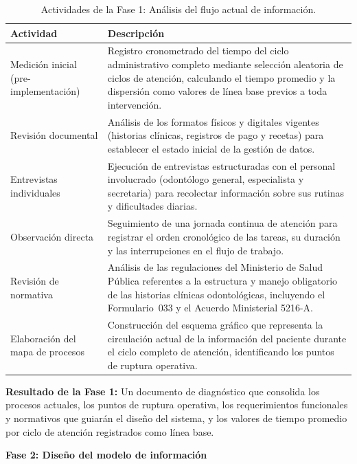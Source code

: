 \begin{table}[H]
\centering
\begin{tabular}{|p{4.5cm}|p{9cm}|}
\hline
\textbf{Actividad} & \textbf{Descripción} \\ \hline
Medición inicial
(pre-implemen\-tación)
  & Registro cronometrado del tiempo del ciclo administrativo
    completo mediante selección aleatoria de ciclos de atención,
    calculando el tiempo promedio y la dispersión como valores
    de línea base previos a toda intervención. \\ \hline
Revisión documental
  & Análisis de los formatos físicos y digitales vigentes
    (historias clínicas, registros de pago y recetas) para
    establecer el estado inicial de la gestión de datos. \\ \hline
Entrevistas individuales
  & Ejecución de entrevistas estructuradas con el personal
    involucrado (odontólogo general, especialista y secretaria)
    para recolectar información sobre sus rutinas y dificultades
    diarias. \\ \hline
Observación directa
  & Seguimiento de una jornada continua de atención para
    registrar el orden cronológico de las tareas, su duración
    y las interrupciones en el flujo de trabajo. \\ \hline
Revisión de normativa
  & Análisis de las regulaciones del Ministerio de Salud
    Pública referentes a la estructura y manejo obligatorio
    de las historias clínicas odontológicas, incluyendo el
    Formulario~033 y el Acuerdo Ministerial 5216-A. \\ \hline
Elaboración del mapa
de procesos
  & Construcción del esquema gráfico que representa la
    circulación actual de la información del paciente durante
    el ciclo completo de atención, identificando los puntos
    de ruptura operativa. \\ \hline
\end{tabular}
\caption{Actividades de la Fase 1: Análisis del flujo actual
         de información.}
\label{tab:actividades_fase1}
\end{table}

\noindent\textbf{Resultado de la Fase 1:} Un documento de
diagnóstico que consolida los procesos actuales, los puntos de
ruptura operativa, los requerimientos funcionales y normativos
que guiarán el diseño del sistema, y los valores de tiempo
promedio por ciclo de atención registrados como línea base.

\bigskip
\noindent\textbf{Fase 2: Diseño del modelo de información}

